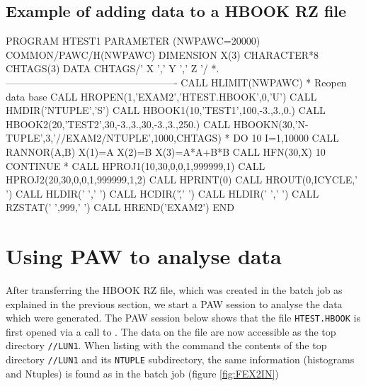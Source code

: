 \subsection*{Example of adding data to a HBOOK RZ file}
\begin{talltt}
      PROGRAM HTEST1
      PARAMETER (NWPAWC=20000)
      COMMON/PAWC/H(NWPAWC)
      DIMENSION X(3)
      CHARACTER*8 CHTAGS(3)
      DATA CHTAGS/'   X   ','   Y   ','   Z   '/
*.----------------------------------------------------
      CALL HLIMIT(NWPAWC)
*             Reopen data base
      CALL HROPEN(1,'EXAM2','HTEST.HBOOK',0,'U')
      CALL HMDIR('NTUPLE','S')
      CALL HBOOK1(10,'TEST1',100,-3.,3.,0.)
      CALL HBOOK2(20,'TEST2',30,-3.,3.,30,-3.,3.,250.)
      CALL HBOOKN(30,'N-TUPLE',3,'//EXAM2/NTUPLE',1000,CHTAGS)
*
      DO 10 I=1,10000
         CALL RANNOR(A,B)
         X(1)=A
         X(2)=B
         X(3)=A*A+B*B
         CALL HFN(30,X)
  10  CONTINUE
*
      CALL HPROJ1(10,30,0,0,1,999999,1)
      CALL HPROJ2(20,30,0,0,1,999999,1,2)
      CALL HPRINT(0)
      CALL HROUT(0,ICYCLE,' ')
      CALL HLDIR(' ',' ')
      CALL HCDIR('\',' ')
      CALL HLDIR(' ',' ')
      CALL RZSTAT(' ',999,' ')
      CALL HREND('EXAM2')
      END
\end{talltt}


\section{Using PAW to analyse data}

After transferring the HBOOK RZ file, which was created in the batch
job as explained in the previous section, we start a PAW session
to analyse the data which were generated.
The PAW session below shows that the file \texttt{HTEST.HBOOK}
is first opened via a call to .
The data on the file are now accessible as the top directory
\texttt{//LUN1}. When listing with the  command the
contents of the top directory \texttt{//LUN1} and its \texttt{NTUPLE}
subdirectory, the same information (histograms and Ntuples) is found
as in the batch job (figure \ref{fig:FEX2IN})

